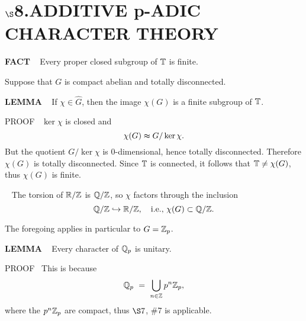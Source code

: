 \chapter{
$\boldsymbol{\S}$\textbf{8}.\quad  ADDITIVE p-ADIC CHARACTER THEORY}
\setlength\parindent{2em}
\setcounter{theoremn}{0}


\begin{x}{\small\bf FACT} \ %
Every proper closed subgroup of $\mathbb{T}$ is finite.
\end{x}

\vspace{0.1cm}

Suppose that $G$ is compact abelian and totally disconnected.

\vspace{0.1cm}

\begin{x}{\small\bf LEMMA} \ %
If $\chi \in \widehat{G}$, then the image $\chi(G)$ is a finite subgroup of $\mathbb{T}$.

\vspace{0.1cm}

PROOF \  $\ker \chi$ is closed and 
\[
\chi(G) \thickapprox G / \ker \chi.
\]
But the quotient $G / \ker \chi$ is 0-dimensional, hence totally disconnected.  
Therefore $\chi(G)$ is totally disconnected.  
Since $\mathbb{T}$ is connected, it follows that $\mathbb{T} \ne \chi(G)$, thus $\chi(G)$ is finite.
\end{x}

\vspace{0.1cm}

\begin{x}{\small\bf {}} \ %
The torsion of $\mathbb{R}/\mathbb{Z}$ is $\mathbb{Q}/\mathbb{Z}$, so $\chi$ factors through the inclusion
\[
\mathbb{Q}/\mathbb{Z} \hookrightarrow \mathbb{R}/\mathbb{Z}, \quad \text{i.e., } \chi(G) \subset \mathbb{Q}/\mathbb{Z}.
\]
\end{x}

\vspace{0.1cm}

The foregoing applies in particular to $G = \mathbb{Z}_p$.

\vspace{0.1cm}

\begin{x}{\small\bf LEMMA} \ %
Every character of $\mathbb{Q}_p$ is unitary.

\vspace{0.1cm}

PROOF \   This is because
\[
\mathbb{Q}_p \ = \  \bigcup_{n \in \mathbb{Z}} p^n \mathbb{Z}_p,
\]
where the $p^n \mathbb{Z}_p$ are compact, thus $\S7$, $\# 7$ is applicable.
\end{x}

